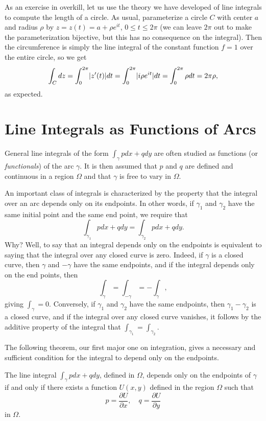 \begin{example}
As an exercise in overkill, let us use the theory we have developed of line integrals to compute the length of a circle. As usual, parameterize a circle $C$ with center $a$ and radius $\rho$ by $z=z(t)=a+\rho e^{it}$, $0 \le t \le 2\pi$ (we can leave $2\pi$ out to make the parameterization bijective, but this has no consequence on the integral). Then the circumference is simply the line integral of the constant function $f=1$ over the entire circle, so we get $$\int_{C}dz=\int_{0}^{2\pi}\lvert z'(t) \rvert dt=\int_{0}^{2\pi}\lvert i\rho e^{it} \rvert dt=\int_{0}^{2\pi}\rho dt=2\pi\rho,$$ as expected.
\end{example}

\section{Line Integrals as Functions of Arcs}

General line integrals of the form $\int_{\gamma} p dx+q dy$ are often studied as functions (or \emph{functionals}) of the arc $\gamma$. It is then assumed that $p$ and $q$ are defined and continuous in a region $\Omega$ and that $\gamma$ is free to vary in $\Omega$.

An important class of integrals is characterized by the property that the integral over an arc depends only on its endpoints. In other words, if $\gamma_1$ and $\gamma_2$ have the same initial point and the same end point, we require that $$\int_{\gamma_1} p dx+q dy=\int_{\gamma_2} p dx+q dy.$$ Why? Well, to say that an integral depends only on the endpoints is equivalent to saying that the integral over any closed curve is zero. Indeed, if $\gamma$ is a closed curve, then $\gamma$ and $-\gamma$ have the same endpoints, and if the integral depends only on the end points, then $$\int_{\gamma}=\int_{-\gamma}=-\int_{\gamma},$$ giving $\int_{\gamma}=0$. Conversely, if $\gamma_1$ and $\gamma_2$ have the same endpoints, then $\gamma_1-\gamma_2$ is a closed curve, and if the integral over any closed curve vanishes, it follows by the additive property of the integral that $\int_{\gamma_1}=\int_{\gamma_2}$.

The following theorem, our first major one on integration, gives a necessary and sufficient condition for the integral to depend only on the endpoints.

\begin{theorem}
\label{thm:exact-differential}
The line integral $\int_{\gamma} p dx+q dy$, defined in $\Omega$, depends only on the endpoints of $\gamma$ if and only if there exists a function $U(x,y)$ defined in the region $\Omega$ such that $$p=\frac{\partial U}{\partial x}, \quad q=\frac{\partial U}{\partial y}$$ in $\Omega$.
\end{theorem}

